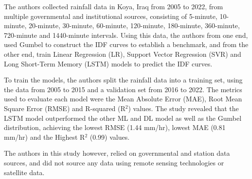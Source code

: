The authors collected rainfall data in Koya, Iraq from 2005 to 2022, from multiple governmental and institutional sources, consisting of 5-minute, 10-minute, 20-minute, 30-minute, 60-minute, 120-minute, 180-minute, 360-minute, 720-minute and 1440-minute intervals. Using this data, the authors from one end, used Gumbel to construct the IDF curves to establish a benchmark, and from the other end, train Linear Regression (LR), Support Vector Regression (SVR) and Long Short-Term Memory (LSTM) models to predict the IDF curves.~\cite{idfkoya}

To train the models, the authors split the rainfall data into a training set, using the data from 2005 to 2015 and a validation set from 2016 to 2022. The metrics used to evaluate each model were the Mean Absolute Error (MAE), Root Mean Square Error (RMSE) and R-squared (R$^{2}$) values. The study revealed that the LSTM model outperformed the other ML and DL model as well as the Gumbel distribution, achieving the lowest RMSE (1.44 mm/hr), lowest MAE (0.81 mm/hr) and the Highest R$^{2}$ (0.99) values.~\cite{idfkoya}

The authors in this study however, relied on governmental and station data sources, and did not source any data using remote sensing technologies or satellite data.

\vspace{1em}

